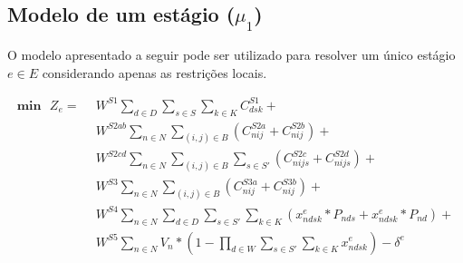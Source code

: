 \documentclass[cic,tc, twoside]{iiufrgs}
\begin{document}
\subsection{Modelo de um estágio ($\mu_1$)}\label{umestagio}

O modelo apresentado a seguir pode ser utilizado para resolver um único estágio $e \in E$ considerando apenas as restrições locais.

\begin{samepage}
\begin{align}
   \textbf{min~~} Z_e =~~&W^{S1} \sum_{d \in D}\sum_{s \in S}\sum_{k \in K} C^{S1}_{dsk}    + \\
  					&W^{S2ab}  \sum_{n \in N}\sum_{(i,j) \in B} (C^{S2a}_{nij} + C^{S2b}_{nij}) + \\
  					& W^{S2cd}  \sum_{n \in N}\sum_{(i,j) \in B}\sum_{s \in S'} (C^{S2c}_{nijs} + C^{S2d}_{nijs}) + \\
					& W^{S3}    \sum_{n \in N}\sum_{(i,j) \in B} (C^{S3a}_{nij} + C^{S3b}_{nij}) + \\
					& W^{S4}    \sum_{n \in N}\sum_{d \in D}\sum_{s \in S'}\sum_{k \in K} (x^e_{ndsk} * P_{nds} + x^e_{ndsk} * P_{nd}) + \label{eS4}\\
					& W^{S5}    \sum_{n \in N} V_{n} * ( 1- \prod_{d \in W} \sum_{s \in S'}\sum_{k \in K} x^e_{ndsk}) -\delta^e  \label{eS5} 
\end{align}  


\end{samepage}
\end{document}
